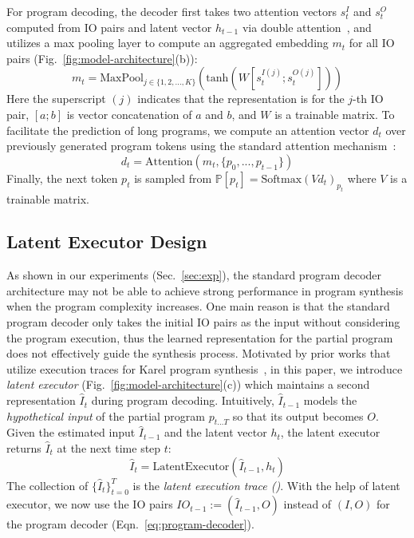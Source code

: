 For program decoding, the decoder first takes two attention vectors $s_t^I$ and $s_t^O$ computed from IO pairs and latent vector $h_{t-1}$ via double attention~\cite{devlin2017robustfill}, and utilizes a max pooling layer to compute an aggregated embedding $m_t$ for all IO pairs
(Fig.~\ref{fig:model-architecture}(b)):
\begin{equation}
m_t=\mathrm{MaxPool}_{j \in \{1,2,...,K\}}(\mathrm{tanh}(W[s_t^{I(j)}; s_t^{O(j)}])) \label{eq:wo-operation-predictor}
\end{equation}
Here the superscript $(j)$ indicates that the representation is for the $j$-th IO pair, $[a; b]$ is vector concatenation of $a$ and $b$, and $W$ is a trainable matrix. To facilitate the prediction of long programs, we compute an attention vector $d_t$ over previously generated program tokens using the standard attention mechanism~\cite{bahdanau2014neural,luong2015effective}: 
\begin{equation} 
d_t=\mathrm{Attention}(m_t, \{p_0, ..., p_{t-1}\}) \label{eq:d-attention}
\end{equation}
Finally, the next token $p_t$ is sampled from $\mathbb{P}[p_t]=\mathrm{Softmax}(Vd_t)_{p_t}$ where $V$ is a trainable matrix.

\subsection{Latent Executor Design}
\vspace{-0.1in}
As shown in our experiments (Sec.~\ref{sec:exp}), the standard program decoder architecture may not be able to achieve strong performance in program synthesis when the program complexity increases. One main reason is that the standard program decoder only takes the initial IO pairs as the input without considering the program execution, thus the learned representation for the partial program does not effectively guide the synthesis process. Motivated by prior works that utilize execution traces for Karel program synthesis~\cite{chen2018execution,shin2018improving,sun2018neural}, in this paper, we introduce \emph{latent executor} (Fig.~\ref{fig:model-architecture}(c)) which maintains a second representation $\hat I_t$ during program decoding. Intuitively, $\hat I_{t-1}$ models the \emph{hypothetical input} of the partial program $p_{t\ldots T}$ so that its output becomes $O$. Given the estimated input $\hat I_{t-1}$ and the latent vector $h_t$, the latent executor returns $\hat I_{t}$ at the next time step $t$: 
\begin{equation}
    \hat I_t = \mathrm{LatentExecutor}(\hat I_{t-1}, h_t)
\end{equation}
The collection of $\{\hat I_t\}_{t=0}^T$ is the \emph{latent execution trace (\laet{})}. With the help of latent executor, we now use the IO pairs $IO_{t-1} := (\hat I_{t-1}, O)$ instead of $(I, O)$ for the program decoder (Eqn.~\ref{eq:program-decoder}).


